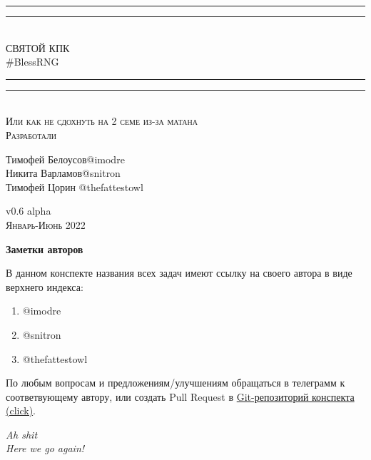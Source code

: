 \documentclass{article}
\begin{document}
\begin{titlepage}
    \centering
    \vspace*{\baselineskip}
    \rule{\textwidth}{1.6pt}\vspace*{-\baselineskip}\vspace*{2pt}
    \rule{\textwidth}{0.4pt}\\[\baselineskip]
    {\LARGE СВЯТОЙ КПК\\ [0.3\baselineskip] \#BlessRNG}\\[0.2\baselineskip]
    \rule{\textwidth}{0.4pt}\vspace*{-\baselineskip}\vspace{3.2pt}
    \rule{\textwidth}{1.6pt}\\[\baselineskip]
    \scshape
    Или как не сдохнуть на 2 семе из-за матана \\
    \vspace*{2\baselineskip}
    Разработали \\[\baselineskip]
    {\Large Тимофей Белоусов\quad @imodre \\ Никита Варламов\quad @snitron\\ Тимофей Цорин \quad @thefattestowl\par}
    \vfill
    v0.6 alpha\\
    {\scshape Январь-Июнь 2022} \par
\end{titlepage}

\textbf{Заметки авторов}

В данном конспекте названия всех задач имеют ссылку на своего автора в виде верхнего индекса:
\begin{enumerate}
    \item @imodre
    \item @snitron
    \item @thefattestowl
\end{enumerate}
По любым вопросам и предложениям/улучшениям обращаться в телеграмм к соответвующему автору, или создать Pull Request в \href{https://github.com/snitron/ct-itmo}{Git-репозиторий конспекта (click)}.

\newpage

\begin{flushright}
\emph{Ah shit\\
Here we go again!}
\end{flushright}

\tableofcontents


\setlength{\parskip}{6pt}%
\newpage
{}
\end{document}
